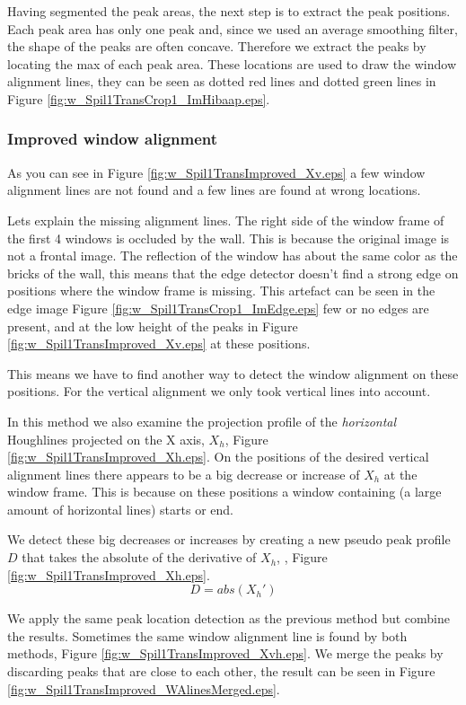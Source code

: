 Having segmented the peak areas, the next step is to extract the peak positions. 
Each peak area has only one peak and, since we used an average smoothing filter, the shape of 
the peaks are often concave. Therefore we extract the peaks by locating the max of each peak area. 
These locations are used to draw the window alignment lines, they can be seen
as dotted red lines and dotted green lines in Figure \ref{fig:w_Spil1TransCrop1_ImHibaap.eps}.


\subsubsection{Improved window alignment}
As you can see in Figure \ref{fig:w_Spil1TransImproved_Xv.eps}
a few window alignment lines are not found and a few lines are found at wrong locations.

Lets explain the missing alignment lines.
The right side of the window frame of the first 4 windows is occluded by the
wall. This is because the original image is not a frontal image.
The reflection of the window has about the same color as the bricks of
the wall, this means that the edge detector
doesn't find a strong edge on positions where the window frame is missing.
This artefact can be seen in the edge image Figure \ref{fig:w_Spil1TransCrop1_ImEdge.eps} few or no edges are present, and
at the low height of the peaks in Figure \ref{fig:w_Spil1TransImproved_Xv.eps} at these positions.

This means we have to find another way to detect the window alignment on these positions.
For the vertical alignment we only took vertical lines into account.

In this method we also examine the projection profile of the \emph{horizontal} Houghlines
projected on the X axis, $X_h$, Figure \ref{fig:w_Spil1TransImproved_Xh.eps}.
On the positions of the desired vertical alignment lines there appears to be a 
big decrease or increase of $X_h$ at the window frame. This is because on these
positions a window containing (a large amount of horizontal lines) starts or end.

We detect these big decreases or increases by creating a new pseudo peak profile
$D$ that takes the absolute of the derivative of $X_h$, , Figure \ref{fig:w_Spil1TransImproved_Xh.eps}.
\[D = abs( X_{h}')\]

We apply the same peak location detection as the previous method but combine the results.
Sometimes the same window alignment line is found by both methods, Figure \ref{fig:w_Spil1TransImproved_Xvh.eps}.  We merge the peaks by discarding peaks that are close to each other, the result can be seen in Figure \ref{fig:w_Spil1TransImproved_WAlinesMerged.eps}.

